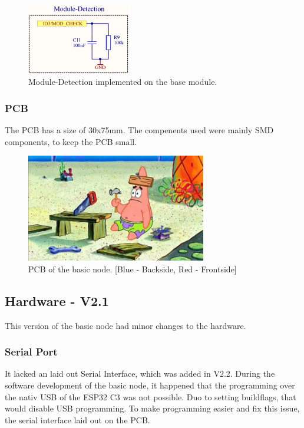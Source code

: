     \begin{figure}[H]
        \centering
        \includegraphics[width=0.4\textwidth]{assets/HW/Module-Detection-schematic.png}
        \caption{Module-Detection implemented on the base module.}
    \end{figure}

    \subsubsection{PCB}

    The PCB has a size of 30x75mm. The compenents used were mainly SMD components, 
    to keep the PCB small. 

    \begin{figure}[H]
        \centering
        \includegraphics[width=0.7\textwidth]{assets/HW/TBD.png}
        \caption{PCB of the basic node. [Blue - Backside, Red - Frontside]}
    \end{figure}	


\subsection{Hardware - V2.1}

    This version of the basic node had minor changes to the hardware. 

    \subsubsection{Serial Port}

        It lacked an laid out Serial Interface, which was added in V2.2.
        During the software development of the basic node, it happened that the 
        programming over the nativ USB of the ESP32 C3 was not possible. Duo to 
        setting buildflags, that would disable USB programming. To make programming
        easier and fix this issue, the serial interface laid out on the PCB. 



